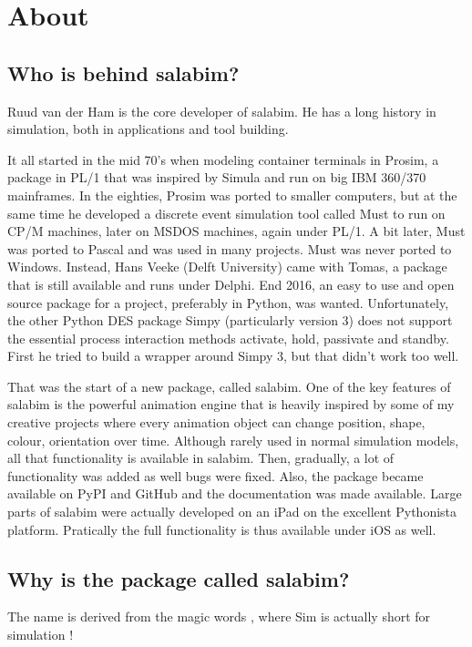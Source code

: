 \documentclass[letterpaper,10pt,english]{sphinxmanual}
\begin{document}
\chapter{About}
\label{\detokenize{About::doc}}\label{\detokenize{About:about}}

\section{Who is behind salabim?}
\label{\detokenize{About:who-is-behind-salabim}}
Ruud van der Ham is the core developer of salabim. He has a long history in simulation, both in
applications and tool building.

It all started in the mid 70’s when modeling container terminals in Prosim, a package
in PL/1 that was inspired by Simula and run on big IBM 360/370 mainframes. 
In the eighties, Prosim was ported to smaller computers, but at the same time he
developed a discrete event simulation tool called Must to run on CP/M machines, later
on MSDOS machines, again under PL/1. A bit later, Must was ported to Pascal and was
used in many projects. Must was never ported to Windows. Instead, Hans Veeke (Delft University)
came with Tomas, a package that is still available and runs under Delphi. 
End 2016, an easy to use and open source package for a project, preferably
in Python, was wanted. Unfortunately, the other Python DES package Simpy (particularly version 3) does not support
the essential
process interaction methods activate, hold, passivate and standby. First he tried to
build a wrapper around Simpy 3, but that didn’t work too well.

That was the start of a new package, called salabim.
One of the key features of salabim is the powerful animation engine that is heavily
inspired by some of my creative projects where every animation object can change position,
shape, colour, orientation over time. Although rarely used in normal simulation models,
all that functionality is available in salabim. 
Then, gradually, a lot of functionality was added as well bugs were fixed. Also, the package became
available on PyPI and GitHub and the documentation was made available. 
Large parts of salabim were actually developed on an iPad on the excellent Pythonista platform. Pratically the full
functionality is thus available under iOS as well.


\section{Why is the package called salabim?}
\label{\detokenize{About:why-is-the-package-called-salabim}}
The name is derived from the magic words ,
where Sim is actually short for simulation !
\end{document}
